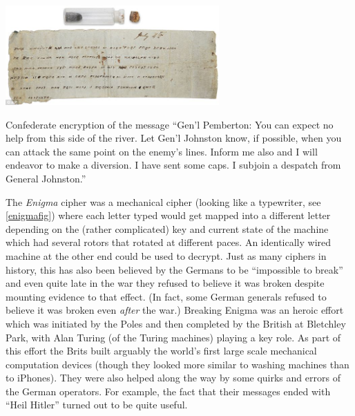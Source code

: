 \begin{marginfigure}
\centering
\includegraphics[width=\linewidth, height=1.5in, keepaspectratio]{../figure/confederate_message.jpg}
\caption{Confederate encryption of the message ``Gen'l Pemberton: You
can expect no help from this side of the river. Let Gen'l Johnston know,
if possible, when you can attack the same point on the enemy's lines.
Inform me also and I will endeavor to make a diversion. I have sent some
caps. I subjoin a despatch from General Johnston.''}
\label{tmplabelfig}
\end{marginfigure}

The \emph{Enigma} cipher was a mechanical cipher (looking like a
typewriter, see \cref{enigmafig}) where each letter typed would get
mapped into a different letter depending on the (rather complicated) key
and current state of the machine which had several rotors that rotated
at different paces. An identically wired machine at the other end could
be used to decrypt. Just as many ciphers in history, this has also been
believed by the Germans to be ``impossible to break'' and even quite
late in the war they refused to believe it was broken despite mounting
evidence to that effect. (In fact, some German generals refused to
believe it was broken even \emph{after} the war.) Breaking Enigma was an
heroic effort which was initiated by the Poles and then completed by the
British at Bletchley Park, with Alan Turing (of the Turing machines)
playing a key role. As part of this effort the Brits built arguably the
world's first large scale mechanical computation devices (though they
looked more similar to washing machines than to iPhones). They were also
helped along the way by some quirks and errors of the German operators.
For example, the fact that their messages ended with ``Heil Hitler''
turned out to be quite useful.

